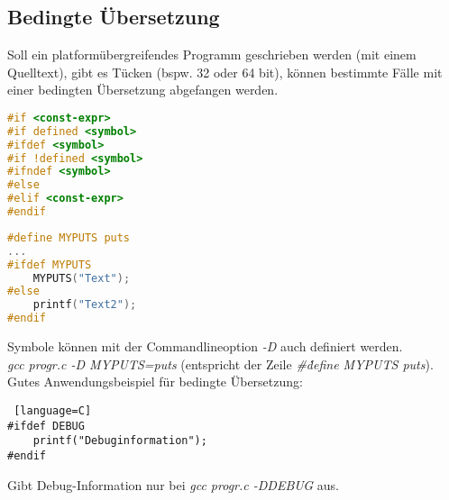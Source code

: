 \subsection{Bedingte Übersetzung}

Soll ein platformübergreifendes Programm geschrieben werden (mit einem Quelltext), gibt es Tücken (bspw. 32 oder 64 bit), können bestimmte Fälle mit einer bedingten Übersetzung abgefangen werden.
\begin{lstlisting}[language=C]
#if <const-expr>
#if defined <symbol>
#ifdef <symbol>
#if !defined <symbol>
#ifndef <symbol>
#else 
#elif <const-expr>
#endif
\end{lstlisting}

\begin{lstlisting}[language=C]
#define MYPUTS puts
...
#ifdef MYPUTS
	MYPUTS("Text");
#else
	printf("Text2");
#endif
\end{lstlisting}
Symbole können mit der Commandlineoption \emph{-D} auch definiert werden.\\
\emph{gcc progr.c -D MYPUTS=puts} (entspricht der Zeile \emph{\#\. define MYPUTS puts}). \medskip\\
Gutes Anwendungsbeispiel für bedingte Übersetzung:
\begin{lstlisting} [language=C]
#ifdef DEBUG
	printf("Debuginformation");
#endif
\end{lstlisting}
Gibt Debug-Information nur bei \emph{gcc progr.c -DDEBUG} aus.

